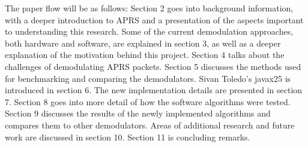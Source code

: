 The paper flow will be as follows: Section 2 goes into background information, with a deeper introduction to APRS and a presentation of the aspects important to understanding this research. Some of the current demodulation approaches, both hardware and software, are explained in section 3, as well as a deeper explanation of the motivation behind this project. Section 4 talks about the challenges of demodulating APRS packets. Section 5 discusses the methods used for benchmarking and comparing the demodulators. Sivan Toledo's javax25 is introduced in section 6. The new implementation details are presented in section 7. Section 8 goes into more detail of how the software algorithms were tested. Section 9 discusses the results of the newly implemented algorithms and compares them to other demodulators. Areas of additional research and future work are discussed in section 10. Section 11 is concluding remarks.

